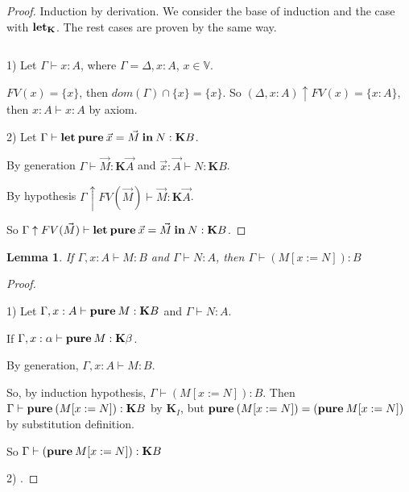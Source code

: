 \documentclass[a4paper]{article}
\newtheorem{lemma}{Lemma}
\begin{document}
  \begin{proof}

  Induction by derivation. We consider the base of induction and the case with  ${\bf let}_{\textbf{K}}$. The rest
  cases are
  proven by the same way.

  $ $

  1) Let $\Gamma \vdash x : A$, where $\Gamma = \Delta, x : A$, $x \in \mathbb{V}$.

  $FV(x) = \{ x\}$, then $dom(\Gamma) \cap \{ x\} = \{ x\}. $ So $(\Delta, x : A) \uparrow FV(x) = \{ x
  : A\}$, then $x : A \vdash x : A$ by axiom.

  2) Let $\Gamma \vdash {\bf let \: pure \:} \vec{x} = \vec{M} {\bf \: in \:} N : \textbf{K}B$.

  By generation $\Gamma \vdash \vec{M} : \textbf{K}\vec{A}$ and $\vec{x} : \vec{A} \vdash N : \textbf{K}B$.

  By hypothesis $\Gamma \uparrow FV(\vec{M}) \vdash \vec{M} : \textbf{K}\vec{A}$.

  So $\Gamma \uparrow FV(\vec{M}) \vdash {\bf let \: pure \:} \vec{x} = \vec{M} {\bf \: in \:} N : \textbf{K}B$.

  \end{proof}

  \vspace{\baselineskip}

  \begin{lemma}

  If $\Gamma, x : A \vdash M : B$  and $\Gamma \vdash N : A$, then $\Gamma \vdash (M [x := N]) :
  B $

  \end{lemma}

  \begin{proof}

  $ $

  1) Let $\Gamma, x : A \vdash {\bf pure \: } M : \textbf{K}B$ and $\Gamma \vdash N : A$.

  If $\Gamma, x : \alpha \vdash {\bf pure \: } M : \textbf{K}\beta$.

  By generation, $\Gamma, x : A \vdash M : B$.

  So, by induction hypothesis, $\Gamma \vdash (M [x := N]) : B $.
  Then $\Gamma \vdash {\bf pure \: } (M [x := N]) : \textbf{K}B$ by $\textbf{K}_I$, but ${\bf pure \: } (M [x := N]) =
  ({\bf pure \: } M [x := N])$ by substitution definition.

  So $\Gamma \vdash ({\bf pure \: } M [x := N]) : \textbf{K}B$

  2) .

  \end{proof}
\end{document}
